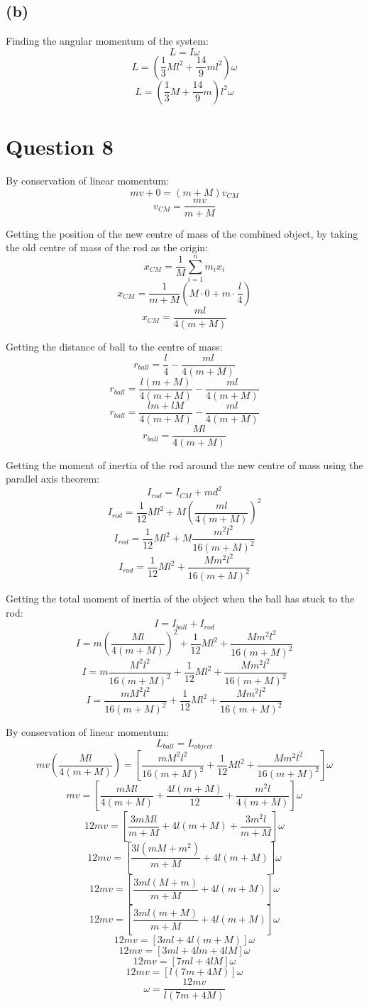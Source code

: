 \documentclass[11pt]{article}
\begin{document}
\subsection{(b)}
\label{sec:orge9bb58c}
Finding the angular momentum of the system:
\[L = I \omega\]
\[L = \left(\frac{1}{3}Ml^2 + \frac{14}{9}ml^2 \right) \omega\]
\[L = \left(\frac{1}{3}M + \frac{14}{9}m \right) l^2 \omega\]


\section{Question 8}
\label{sec:org6d37912}
By conservation of linear momentum:
\[mv + 0 = (m + M)v_{CM}\]
\[v_{CM} = \frac{mv}{m + M}\]

Getting the position of the new centre of mass of the combined object, by taking the old centre of mass of the rod as the origin:
\[x_{CM} = \frac{1}{M} \sum_{i = 1}^n m_i x_i\]
\[x_{CM} = \frac{1}{m + M} \left(M \cdot 0 + m \cdot \frac{l}{4} \right)\]
\[x_{CM} = \frac{ml}{4(m + M)}\]

Getting the distance of ball to the centre of mass:
\[r_{ball} = \frac{l}{4} - \frac{ml}{4(m + M)}\]
\[r_{ball} = \frac{l(m + M)}{4(m + M)} - \frac{ml}{4(m + M)}\]
\[r_{ball} = \frac{lm + lM}{4(m + M)} - \frac{ml}{4(m + M)}\]
\[r_{ball} = \frac{Ml}{4(m + M)}\]

Getting the moment of inertia of the rod around the new centre of mass using the parallel axis theorem:
\[I_{rod} = I_{CM} + md^2\]
\[I_{rod} = \frac{1}{12}Ml^2 + M \left( \frac{ml}{4(m + M)} \right)^2\]
\[I_{rod} = \frac{1}{12}Ml^2 + M \frac{m^2l^2}{16(m + M)^2}\]
\[I_{rod} = \frac{1}{12}Ml^2 + \frac{Mm^2l^2}{16(m + M)^2}\]

Getting the total moment of inertia of the object when the ball has stuck to the rod:
\[I = I_{ball} + I_{rod}\]
\[I = m \left(\frac{Ml}{4(m + M)} \right)^2 + \frac{1}{12}Ml^2 + \frac{Mm^2l^2}{16(m + M)^2}\]
\[I = m \frac{M^2l^2}{16(m + M)^2} + \frac{1}{12}Ml^2 + \frac{Mm^2l^2}{16(m + M)^2}\]
\[I = \frac{mM^2l^2}{16(m + M)^2} + \frac{1}{12}Ml^2 + \frac{Mm^2l^2}{16(m + M)^2}\]

By conservation of linear momentum:
\[L_{ball} = L_{object}\]
\[mv \left(\frac{Ml}{4(m + M)} \right) = \left[\frac{mM^2l^2}{16(m + M)^2} + \frac{1}{12}Ml^2 + \frac{Mm^2l^2}{16(m + M)^2} \right] \omega\]
\[mv = \left[\frac{mMl}{4(m + M)} + \frac{4l(m + M)}{12} + \frac{m^2l}{4(m + M)} \right] \omega\]
\[12mv = \left[\frac{3mMl}{m + M} + 4l(m + M) + \frac{3m^2l}{m + M} \right] \omega\]
\[12mv = \left[\frac{3l (mM + m^2)}{m + M} + 4l(m + M) \right] \omega\]
\[12mv = \left[\frac{3ml (M + m)}{m + M} + 4l(m + M) \right] \omega\]
\[12mv = \left[\frac{3ml (m + M)}{m + M} + 4l(m + M) \right] \omega\]
\[12mv = \left[3ml + 4l(m + M) \right] \omega\]
\[12mv = \left[3ml + 4lm + 4lM \right] \omega\]
\[12mv = \left[7ml + 4lM \right] \omega\]
\[12mv = \left[l(7m + 4M) \right] \omega\]
\[\omega = \frac{12mv}{l(7m + 4M)}\]
\end{document}
